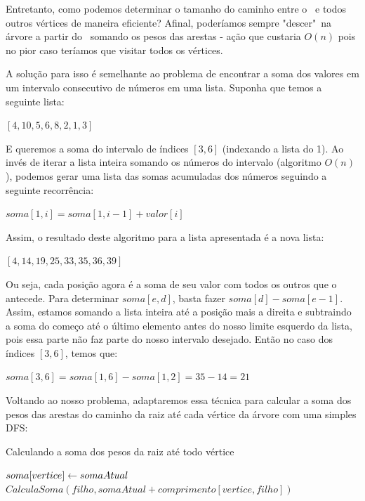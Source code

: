 Entretanto, como podemos determinar o tamanho do caminho entre o \LCA\ e todos outros vértices de maneira eficiente? Afinal, poderíamos sempre "descer"\ na árvore a partir do \LCA\ somando os pesos das arestas - ação que custaria $O(n)$ pois no pior caso teríamos que visitar todos os vértices.

A solução para isso é semelhante ao problema de encontrar a soma dos valores em um intervalo consecutivo de números em uma lista. Suponha que temos a seguinte lista:

\begin{center}
    $[4, 10, 5, 6, 8, 2, 1, 3]$
\end{center}

E queremos a soma do intervalo de índices $[3, 6]$ (indexando a lista do 1). Ao invés de iterar a lista inteira somando os números do intervalo (algoritmo $O(n)$), podemos gerar uma lista das somas acumuladas dos números seguindo a seguinte recorrência:

\begin{center}
    $soma[1, i] = soma[1, i-1] + valor[i]$
\end{center}

Assim, o resultado deste algoritmo para a lista apresentada é a nova lista:

\begin{center}
    $[4, 14, 19, 25, 33, 35, 36, 39]$
\end{center}

Ou seja, cada posição agora é a soma de seu valor com todos os outros que o antecede. Para determinar $soma[e, d]$, basta fazer $soma[d] - soma[e-1]$. Assim, estamos somando a lista inteira até a posição mais a direita e subtraindo a soma do começo até o último elemento antes do nosso limite esquerdo da lista, pois essa parte não faz parte do nosso intervalo desejado. Então no caso dos índices $[3, 6]$, temos que:

\begin{center}
    $soma[3, 6] = soma[1, 6] - soma[1, 2] = 35 - 14 = 21$\\
\end{center}

Voltando ao nosso problema, adaptaremos essa técnica para calcular a soma dos pesos das arestas do caminho da raiz até cada vértice da árvore com uma simples DFS:

\begin{algorithm}[H]
\caption{Calculando a soma dos pesos da raiz até todo vértice}
\begin{algorithmic}[1]
    \State $soma[vertice] \leftarrow somaAtual$
        \State $CalculaSoma(filho, somaAtual + comprimento[vertice, filho])$
    \EndFor
\EndFunction
\end{algorithmic}
\end{algorithm}

